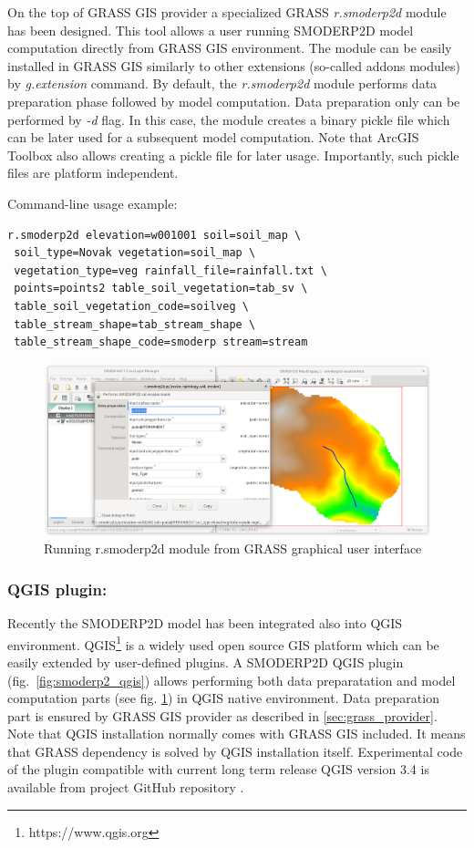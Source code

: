 On the top of GRASS GIS provider a specialized GRASS {\em r.smoderp2d}
module has been designed. This tool allows a user running SMODERP2D
model computation directly from GRASS GIS environment. The module can
be easily installed in GRASS GIS similarly to other extensions
(so-called addons modules) by {\em g.extension} command. By default,
the {\em r.smoderp2d} module performs data preparation phase followed by
model computation. Data preparation only can be performed by {\em -d}
flag. In this case, the module creates a binary pickle file which can
be later used for a subsequent model computation. Note that ArcGIS
Toolbox also allows creating a pickle file for later
usage. Importantly, such pickle files are platform independent.

Command-line usage example:
\begin{verbatim}
r.smoderp2d elevation=w001001 soil=soil_map \
 soil_type=Novak vegetation=soil_map \
 vegetation_type=veg rainfall_file=rainfall.txt \
 points=points2 table_soil_vegetation=tab_sv \
 table_soil_vegetation_code=soilveg \
 table_stream_shape=tab_stream_shape \
 table_stream_shape_code=smoderp stream=stream 
\end{verbatim}

\begin{figure}[ht!]
  \begin{center}
    \includegraphics[width=1.0\columnwidth]{figures/smoderp2d_grass.png}
    \caption{Running r.smoderp2d module from GRASS graphical user interface}
    \label{fig:uml_diagram}
  \end{center}
\end{figure}

\subsubsection{QGIS plugin:}
Recently the SMODERP2D model has been integrated also into QGIS
environment. QGIS\footnote{https://www.qgis.org} is a widely used open
source GIS platform which can be easily extended by user-defined
plugins. A SMODERP2D QGIS plugin (fig.~\ref{fig:smoderp2_qgis}) allows
performing both data preparatation and model computation parts (see
fig. \ref{fig:uml_diagram}) in QGIS native environment. Data
preparation part is ensured by GRASS GIS provider as described in
\ref{sec:grass_provider}. Note that QGIS installation normally comes
with GRASS GIS included. It means that GRASS dependency is solved by
QGIS installation itself. Experimental code of the plugin compatible
with current long term release QGIS version 3.4 is available from
project GitHub repository \cite{smoderp2d-github-2019}.

